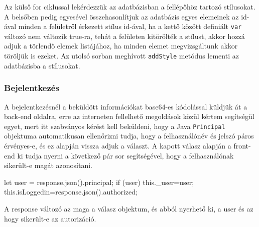 Az külső for ciklussal lekérdezzük az adatbázisban a fellépőhöz tartozó stílusokat. A belsőben pedig egyesével összehasonlítjuk az adatbázis egyes elemeinek az id-ával minden a felületről érkezett stílus id-ával, ha a kettő között definiált \texttt{var} változó nem változik true-ra, tehát a felületen kitörölték a stílust, akkor hozzá adjuk a törlendő elemek listájához, ha minden elemet megvizsgáltunk akkor töröljük is ezeket.
Az utolsó sorban meghívott \texttt{addStyle} metódus lementi az adatbázisba a stílusokat.

\subsubsection{Bejelentkezés}
A bejelentkezésnél a beküldött információkat base64-es kódolással küldjük át a back-end oldalra, erre az  interneten fellelhető megoldások közül kértem segítségül egyet, mert itt szabványos kérést kell beküldeni, hogy a Java \texttt{Principal} objektuma automatikusan ellenőrizni tudja, hogy a felhasználónév és jelszó páros érvényes-e, és ez alapján vissza adjuk a választ. A kapott válasz alapján a front-end ki tudja nyerni a következő pár sor segítségével, hogy a felhasználónak sikerült-e magát azonosítani.
\begin{java}
let user = response.json().principal;
if (user) {
	this._user=user;
	this.isLoggedin=response.json().authorized;
}
\end{java}
A response változó az maga a válasz objektum, és abból nyerhető ki, a user és az hogy sikerült-e az autorizáció.

